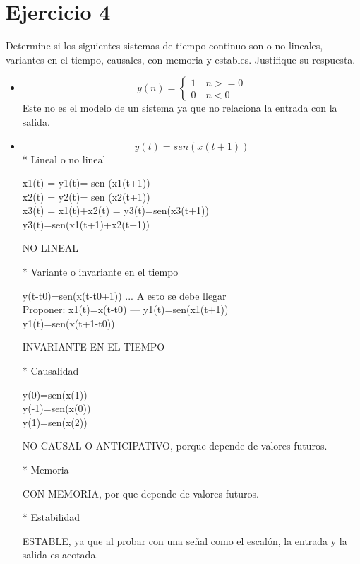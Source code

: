 \documentclass[10pt,a4paper]{report}
\begin{document}
\section{Ejercicio 4}
Determine si los siguientes sistemas de tiempo continuo son o no lineales, variantes en el tiempo, causales, con memoria y estables. Justifique su respuesta.
\begin{itemize}
\item \begin{equation}
 y(n)=
 \left\{
  \begin{aligned}
   1\quad n>=0\\
   0\quad n<0\
  \end{aligned}
 \right.
\label{escunit}
\end{equation}
Este no es el modelo de un sistema ya que no relaciona la entrada con la salida.
\item  \begin{equation*}
y(t)=sen(x(t+1))
\end{equation*}
* Lineal o no lineal

   x1(t) = y1(t)= sen (x1(t+1))\\
   x2(t) = y2(t)= sen (x2(t+1))\\
   x3(t) = x1(t)+x2(t) = y3(t)=sen(x3(t+1))\\
                         y3(t)=sen(x1(t+1)+x2(t+1))

 NO LINEAL

* Variante o invariante en el tiempo

  y(t-t0)=sen(x(t-t0+1)) ... A esto se debe llegar\\
  Proponer: x1(t)=x(t-t0) --- y1(t)=sen(x1(t+1))\\
  y1(t)=sen(x(t+1-t0))

  INVARIANTE EN EL TIEMPO

* Causalidad

y(0)=sen(x(1))\\
y(-1)=sen(x(0))\\
y(1)=sen(x(2))

NO CAUSAL O ANTICIPATIVO, porque depende de valores futuros.

* Memoria

CON MEMORIA, por que depende de valores futuros.

* Estabilidad

ESTABLE, ya que al probar con una señal como el escalón, la entrada y la salida es acotada.

\end{itemize}
\end{document}
